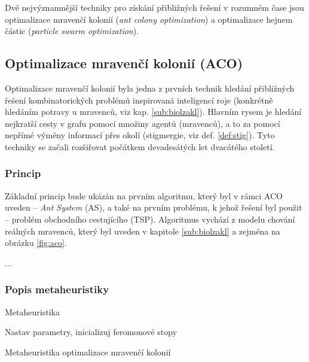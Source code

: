 \documentclass[a4paper,12pt]{article}
\begin{document}
Dvě nejvýznamnější techniky pro získání přibližných řešení v rozumném čase jsou optimalizace mravenčí
kolonií ({\it ant colony optimization}) a optimalizace hejnem částic ({\it particle swarm optimization}).

\subsection{Optimalizace mravenčí kolonií (ACO)}
Optimalizace mravenčí kolonií byla jedna z prvních technik hledání přibližných řešení kombinatorických
problémů inspirovaná inteligencí roje (konkrétně hledáním potravy u mravenců, viz kap. \ref{sub:biolzakl}).
Hlavním rysem je hledání nejkratší cesty v grafu pomocí množiny agentů (mravenců), a to za pomocí nepřímé výměny
informací přes okolí (stigmergie, viz def. \ref{def:stig}). Tyto techniky se začali rozšiřovat počátkem devadesátých let dvacátého století.

\subsubsection{Princip}
Základní princip bude ukázán na prvním algoritmu, který byl v rámci ACO uveden -- {\it Ant System} (AS), a také
na prvním problému, k jehož řešení byl použit -- problém obchodního cestujícího (TSP). Algoritmus vychází z modelu
chování reálných mravenců, který byl uveden v kapitole \ref{sub:biolzakl} a zejména na obrázku \ref{fig:aco}.




...

\subsubsection{Popis metaheuristiky}
Metaheuristika 


\begin{algorithm}[here]
  \DontPrintSemicolon
  \SetAlgoNoLine
  Nastav parametry, inicializuj feromonové stopy\;  
\caption{Metaheuristika optimalizace mravenčí kolonií\label{alg:aco}}
\end{algorithm}
\end{document}
